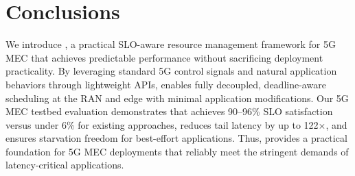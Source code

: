 \section{Conclusions}
\label{sec:concl}

We introduce \sys{}, a practical SLO-aware resource management framework for 5G MEC that achieves predictable performance without sacrificing deployment practicality.
By leveraging standard 5G control signals and natural application behaviors through lightweight APIs, \sys{} enables fully decoupled, deadline-aware scheduling at the RAN and edge with minimal application modifications.
Our 5G MEC testbed evaluation demonstrates that \sys{} achieves 90--96\% SLO satisfaction versus under 6\% for existing approaches, reduces tail latency by up to 122$\times$, and ensures starvation freedom for best-effort applications.
Thus, \sys{} provides a practical foundation for 5G MEC deployments that reliably meet the stringent demands of latency-critical applications.